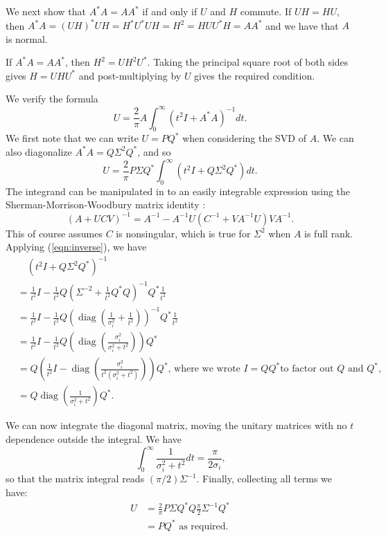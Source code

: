 \documentclass[12pt]{article}
\def\diag{\mathop{\mathrm{diag}}}     %
\begin{document}
We next show that $A^*A = AA^*$ if and only if $U$ and $H$ commute.
If $UH=HU$, then $A^*A = (UH)^*UH = H^*U^*UH = H^2 = HUU^*H = AA^*$
and we have that $A$ is normal.

If $A^*A = AA^*$, then $H^2 = UH^2U^*$. Taking the principal square root of
both sides gives $H = UHU^*$ and post-multiplying by $U$ gives the required
condition.

We verify the formula
\begin{equation} \label{eqn:U-integral}
  U = \frac{2}{\pi}A\int_{0}^{\infty}(t^2I + A^*A)^{-1}dt\text{.}
\end{equation}
We first note that we can write $U=PQ^*$ when considering the SVD of $A$. We
can also diagonalize $A^*A = Q\Sigma^2 Q^*$, and so
\begin{equation}
  U = \frac{2}{\pi}P\Sigma Q^*\int_0^{\infty}(t^2I + Q\Sigma^2 Q^*)dt\text{.}
\end{equation}
The integrand can be manipulated in to an easily integrable expression using the
Sherman-Morrison-Woodbury matrix identity \cite{high:ASNA2}:
\begin{equation}\label{eqn:inverse}
  (A+UCV)^{-1} = A^{-1} - A^{-1}U(C^{-1} + VA^{-1}U)VA^{-1}\text{.}
\end{equation}
This of course assumes $C$ is nonsingular, which is true for $\Sigma^2$ when $A$
is full rank. Applying (\ref{eqn:inverse}), we have
\begin{align*}
  &\quad (t^2I + Q\Sigma^2Q^*)^{-1} \\
  & = \frac{1}{t^2}I - \frac{1}{t^2}Q(\Sigma^{-2} + \frac{1}{t^2}Q^*Q)^{-1}Q^*\frac{1}{t^2} \\
  & = \frac{1}{t^2}I - \frac{1}{t^2}Q(\diag(\frac{1}{\sigma_i^2}
    + \frac{1}{t^2}))^{-1}Q^*\frac{1}{t^2} \\
  & = \frac{1}{t^2}I - \frac{1}{t^2}Q(\diag(\frac{\sigma_i^2}{\sigma_i^2 + t^2}))Q^* \\
  & = Q(\frac{1}{t^2}I - \diag(\frac{\sigma_i^2}{t^2(\sigma_i^2 + t^2)}))Q^*
    \text{, where we wrote } I = QQ^*
  \text{to factor out } Q\text{ and } Q^*\text{,}\\
  & = Q\diag(\frac{1}{\sigma_i^2 + t^2})Q^*\text{.}
\end{align*}

We can now integrate the diagonal matrix, moving the unitary matrices with no
$t$ dependence outside the integral. We have
\begin{equation}
  \int_0^{\infty}\frac{1}{\sigma_i^2+t^2}dt = \frac{\pi}{2\sigma_i}\text{,}
\end{equation}
so that the matrix integral reads $(\pi /2)\Sigma^{-1}$.
Finally, collecting all terms we have:
\begin{align*}
  U & = \frac{2}{\pi}P\Sigma Q^*Q\frac{\pi}{2}\Sigma^{-1}Q^* \\
    & = PQ^* \text{ as required.}
\end{align*}
\end{document}
